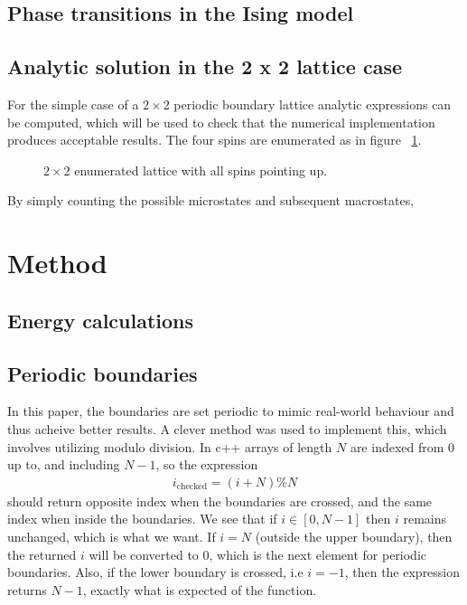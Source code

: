 \documentclass[aps,reprint]{revtex4-1}
\begin{document}
\subsection{Phase transitions in the Ising model}

\subsection{Analytic solution in the 2 x 2 lattice case}
For the simple case of a $2 \times 2$ periodic boundary lattice analytic
expressions can be computed, which will be used to check that the numerical
implementation produces acceptable results. The four spins are enumerated as in
figure ~\ref{fig:22lattice}.
\begin{figure}[H]
  \centering
  \caption{$2 \times 2$ enumerated lattice with all spins pointing up.}
  \label{fig:22lattice}
\end{figure}
By simply counting the possible microstates and subsequent macrostates,
\section{Method}
\label{sec:method}
\subsection{Energy calculations}

\subsection{Periodic boundaries}
In this paper, the boundaries are set periodic to mimic real-world behaviour and
thus acheive better results. A clever method was used to implement this, which
involves utilizing modulo division. In c++ arrays of length $N$ are indexed from
$0$ up to, and including $N-1$, so the expression
\begin{align*}
  i_\text{checked} = (i + N) \% N
\end{align*}
should return opposite index when the boundaries are crossed, and the same
index when inside the boundaries. We see that if $i \in [0, N-1]$ then $i$
remains unchanged, which is what we want. If $i = N$ (outside the upper boundary),
then the returned $i$ will be converted to $0$, which is the next element for
periodic boundaries. Also, if the lower boundary is crossed, i.e $i = -1$, then
the expression returns $N - 1$, exactly what is expected of the function.
\end{document}
